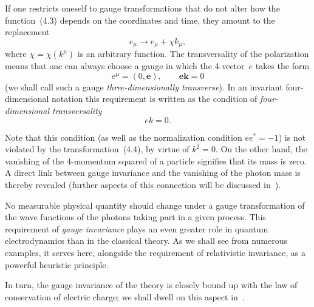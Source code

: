 If one restricts oneself to gauge transformations that do not alter how the function~(4.3) depends on the coordinates and time, they amount to the replacement
\begin{equation}
e_\mu \to e_\mu + \chi k_\mu,
\tag{4.4}
\end{equation}
where $\chi = \chi(k^\mu)$ is an arbitrary function. The transversality of the polarization means that one can always choose a gauge in which the 4-vector~$e$ takes the form
\begin{equation}
e^\mu = (0, \mathbf{e}), \qquad \mathbf{ek} = 0
\tag{4.5}
\end{equation}
(we shall call such a gauge \emph{three-dimensionally transverse}). In an invariant four-dimensional notation this requirement is written as the condition of \emph{four-dimensional transversality}
\begin{equation}
ek = 0.
\tag{4.6}
\end{equation}

Note that this condition (as well as the normalization condition $ee^* = -1$) is not violated by the transformation~(4.4),
by virtue of $k^2 = 0$. On the other hand, the vanishing of the 4-momentum squared of a particle signifies that its mass is zero. A direct link between gauge invariance and the vanishing of the photon mass is thereby revealed (further aspects of this connection will be discussed in~).

No measurable physical quantity should change under a gauge transformation of the wave functions of the photons taking part in a given process. This requirement of \emph{gauge invariance} plays an even greater role in quantum electrodynamics than in the classical theory. As we shall see from numerous examples, it serves here, alongside the requirement of relativistic invariance, as a powerful heuristic principle.

In turn, the gauge invariance of the theory is closely bound up with the law of conservation of electric charge; we shall dwell on this aspect in~.

